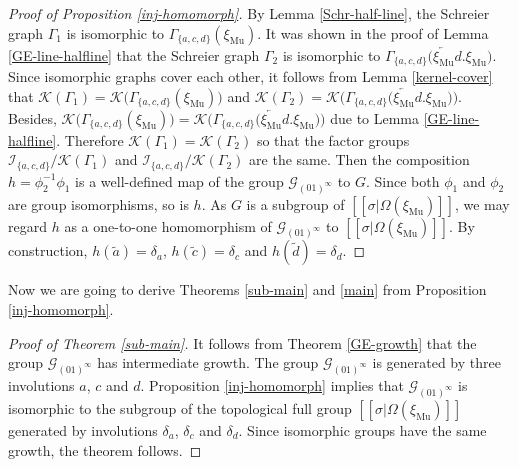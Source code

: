 \documentclass[12pt]{article}
\theoremstyle{definition}
\def\cG{\mathcal{G}}
\def\cI{\mathcal{I}}
\def\cK{\mathcal{K}}
\def\de{\delta}
\def\si{\sigma}
\def\xiGE{\xi_{\mathrm{Mu}}}
\begin{document}
\begin{proof}[Proof of Proposition \ref{inj-homomorph}]
By Lemma \ref{Schr-half-line}, the Schreier graph $\Gamma_1$ is isomorphic 
to $\Gamma_{\{a,c,d\}}(\xiGE)$.  It was shown in the proof of Lemma 
\ref{GE-line-halfline} that the Schreier graph $\Gamma_2$ is isomorphic to 
$\Gamma_{\{a,c,d\}}\bigl(\overleftarrow{\xiGE}d.\xiGE\bigr)$.  Since 
isomorphic graphs cover each other, it follows from Lemma 
\ref{kernel-cover} that $\cK(\Gamma_1)= 
\cK\bigl(\Gamma_{\{a,c,d\}}(\xiGE)\bigr)$ and $\cK(\Gamma_2)=
\cK\bigl(\Gamma_{\{a,c,d\}}\bigl(\overleftarrow{\xiGE}d.\xiGE\bigr)\bigr)$. 
Besides, $\cK\bigl(\Gamma_{\{a,c,d\}}(\xiGE)\bigr)= 
\cK\bigl(\Gamma_{\{a,c,d\}}\bigl(\overleftarrow{\xiGE}d.\xiGE\bigr)\bigr)$ 
due to Lemma \ref{GE-line-halfline}.  Therefore 
$\cK(\Gamma_1)=\cK(\Gamma_2)$ so that the factor groups 
$\cI_{\{a,c,d\}}/\cK(\Gamma_1)$ and $\cI_{\{a,c,d\}}/\cK(\Gamma_2)$ are the 
same.  Then the composition $h=\phi_2^{-1}\phi_1$ is a well-defined map of 
the group $\cG_{(01)^\infty}$ to $G$.  Since both $\phi_1$ and $\phi_2$ are 
group isomorphisms, so is $h$.  As $G$ is a subgroup of 
$[[\si|\Omega(\xiGE)]]$, we may regard $h$ as a one-to-one homomorphism of 
$\cG_{(01)^\infty}$ to $[[\si|\Omega(\xiGE)]]$.  By construction, $h(\tilde 
a)=\de_a$, $h(\tilde c)=\de_c$ and $h(\tilde d)=\de_d$.
\end{proof}

Now we are going to derive Theorems \ref{sub-main} and \ref{main} from 
Proposition \ref{inj-homomorph}.

\begin{proof}[Proof of Theorem \ref{sub-main}]
It follows from Theorem \ref{GE-growth} that the group $\cG_{(01)^\infty}$ 
has intermediate growth.  The group $\cG_{(01)^\infty}$ is generated by 
three involutions $a$, $c$ and $d$.  Proposition \ref{inj-homomorph} 
implies that $\cG_{(01)^\infty}$ is isomorphic to the subgroup of the 
topological full group $[[\si|\Omega(\xiGE)]]$ generated by involutions 
$\de_a$, $\de_c$ and $\de_d$.  Since isomorphic groups have the same 
growth, the theorem follows.
\end{proof}
\end{document}
